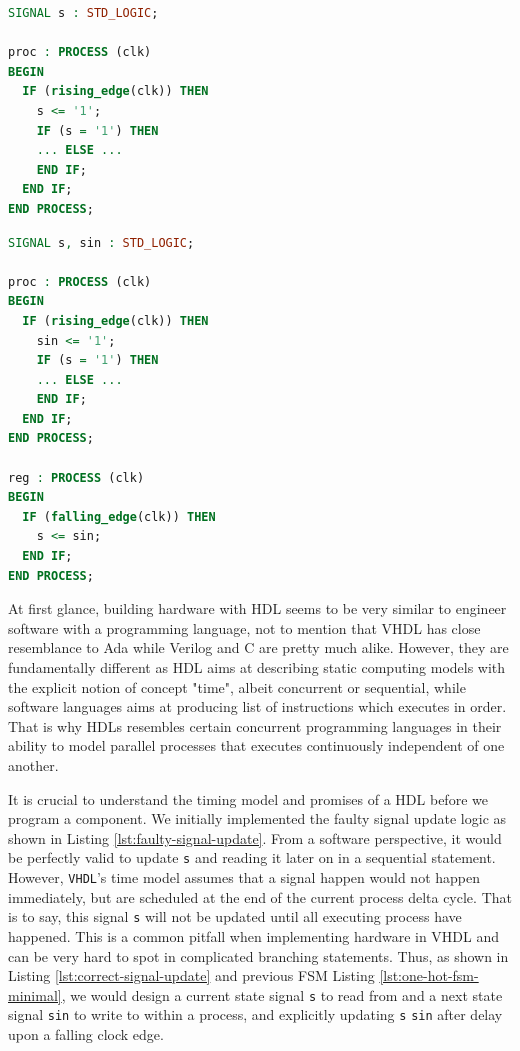 \documentclass[a4paper]{report}
\newcommand{\proglang}{\textsf}
\newcommand{\code}{\texttt}
\begin{document}
\begin{minipage}{.45\textwidth}
\begin{lstlisting}[language=VHDL, caption=Faulty Signal Update in \proglang{VHDL}, label={lst:faulty-signal-update}]
SIGNAL s : STD_LOGIC;

proc : PROCESS (clk)
BEGIN
  IF (rising_edge(clk)) THEN
    s <= '1';
    IF (s = '1') THEN
    ... ELSE ...
    END IF;
  END IF;
END PROCESS;
\end{lstlisting}
\end{minipage}\hfill
\begin{minipage}{.45\textwidth}
\begin{lstlisting}[language=VHDL, caption=Correct Signal Update in \proglang{VHDL}, label={lst:correct-signal-update}]
SIGNAL s, sin : STD_LOGIC;

proc : PROCESS (clk)
BEGIN
  IF (rising_edge(clk)) THEN
    sin <= '1';
    IF (s = '1') THEN
    ... ELSE ...
    END IF;
  END IF;
END PROCESS;

reg : PROCESS (clk)
BEGIN
  IF (falling_edge(clk)) THEN
    s <= sin;
  END IF;
END PROCESS;
\end{lstlisting}
\end{minipage}

At first glance, building hardware with HDL seems to be very similar to engineer software with a programming language, not to mention that \proglang{VHDL} has close resemblance to \proglang{Ada} while \proglang{Verilog} and \proglang{C} are pretty much alike. However, they are fundamentally different as HDL aims at describing static computing models with the explicit notion of concept "time", albeit concurrent or sequential, while software languages aims at producing list of instructions which executes in order. That is why HDLs resembles certain concurrent programming languages in their ability to model parallel processes that executes continuously independent of one another.

It is crucial to understand the timing model and promises of a HDL before we program a component. We initially implemented the faulty signal update logic as shown in Listing \ref{lst:faulty-signal-update}. From a software perspective, it would be perfectly valid to update \code{s} and reading it later on in a sequential statement. However, \code{VHDL}'s time model assumes that a signal happen would not happen immediately, but are scheduled at the end of the current process delta cycle. That is to say, this signal \code{s} will not be updated until all executing process have happened. This is a common pitfall when implementing hardware in \proglang{VHDL} and can be very hard to spot in complicated branching statements. Thus, as shown in Listing \ref{lst:correct-signal-update} and previous FSM Listing \ref{lst:one-hot-fsm-minimal}, we would design a current state signal \code{s} to read from and a next state signal \code{sin} to write to within a process, and explicitly updating \code{s} \textleftarrow \code{sin} after delay upon a falling clock edge. 
\end{document}
